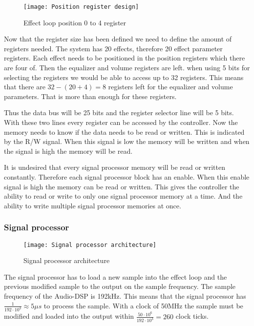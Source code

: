 \begin{figure}[ht]
    \centering
    \texttt{[image: Position register design]}
    \caption{Effect loop position 0 to 4 register}
    \label{fig:reg-position}
\end{figure}

Now that the register size has been defined we need to define the amount of registers needed. The system has 20 effects, therefore 20 effect parameter registers. Each effect needs to be positioned in the position registers which there are four of. Then the equalizer and volume registers are left. when using 5 bits for selecting the registers we would be able to access up to 32 registers. This means that there are $32 - (20 + 4) = 8$ registers left for the equalizer and volume parameters. That is more than enough for these registers.

Thus the data bus will be 25 bits and the register selector line will be 5 bits. With these two lines every register can be accessed by the controller. Now the memory needs to know if the data needs to be read or written. This is indicated by the R/W signal. When this signal is low the memory will be written and when the signal is high the memory will be read.

It is undesired that every signal processor memory will be read or written constantly. Therefore each signal processor block has an enable. When this enable signal is high the memory can be read or written. This gives the controller the ability to read or write to only one signal processor memory at a time. And the ability to write multiple signal processor memories at once.

\subsubsection{Signal processor}
\begin{figure}[ht]
    \texttt{[image: Signal processor architecture]}
    \caption{Signal processor architecture}
    \label{fig:arch-signal-processor}
\end{figure}

The signal processor has to load a new sample into the effect loop and the previous modified sample to the output on the sample frequency. The sample frequency of the Audio-DSP is 192kHz. This means that the signal processor has $\frac{1}{192 \cdot 10^3} \approx 5 \mu s$ to process the sample. With a clock of 50MHz the sample must be modified and loaded into the output within $\frac{50 \cdot 10^6}{192 \cdot 10^3}=260$ clock ticks.

